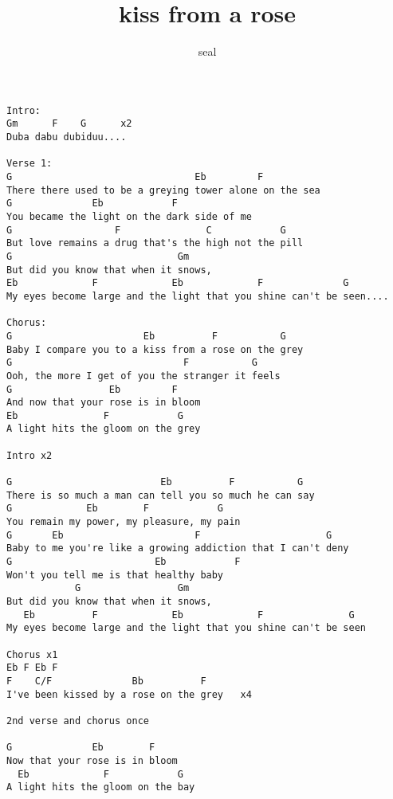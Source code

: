 \author{seal}
\title{kiss from a rose}
\maketitle
\begin{verbatim}
Intro:
Gm      F    G      x2
Duba dabu dubiduu....

Verse 1:
G                                Eb         F
There there used to be a greying tower alone on the sea
G              Eb            F  
You became the light on the dark side of me
G                  F               C            G
But love remains a drug that's the high not the pill
G                             Gm
But did you know that when it snows,
Eb             F             Eb             F              G
My eyes become large and the light that you shine can't be seen....

Chorus:
G                       Eb          F           G
Baby I compare you to a kiss from a rose on the grey
G                              F           G
Ooh, the more I get of you the stranger it feels
G                 Eb         F
And now that your rose is in bloom
Eb               F            G
A light hits the gloom on the grey

Intro x2

G                          Eb          F           G
There is so much a man can tell you so much he can say
G             Eb        F            G
You remain my power, my pleasure, my pain
G       Eb                       F                      G
Baby to me you're like a growing addiction that I can't deny
G                         Eb            F
Won't you tell me is that healthy baby
            G                 Gm
But did you know that when it snows,
   Eb          F             Eb             F               G
My eyes become large and the light that you shine can't be seen

Chorus x1
Eb F Eb F
F    C/F              Bb          F
I've been kissed by a rose on the grey   x4

2nd verse and chorus once

G              Eb        F
Now that your rose is in bloom
  Eb             F            G
A light hits the gloom on the bay
\end{verbatim}